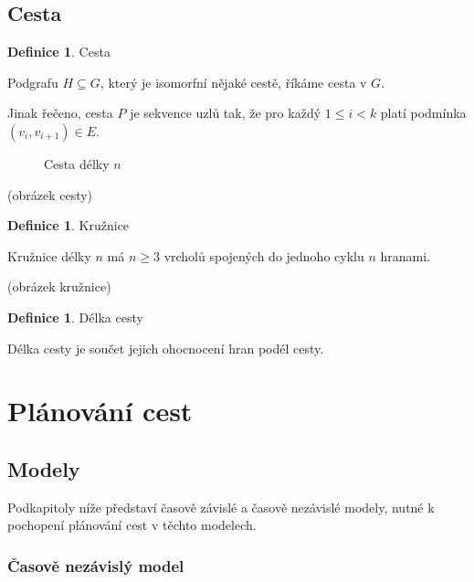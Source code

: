 \documentclass[thesis=M,czech]{FITthesis}[2019/12/23]
\theoremstyle{plain}
\theoremstyle{definition}
\newtheorem{defn}[thm]{Definice} %
\begin{document}
\subsection{Cesta}

\begin{defn}{Cesta}\label{thm:graf}

Podgrafu $H \subseteq	 G$, který je isomorfní nějaké cestě, říkáme cesta v $G$. 
\end{defn}

Jinak řečeno, cesta $P$ je sekvence uzlů tak, že pro každý $1 \leq	i < k$ platí podmínka $(v_i, v_{i+1}) \in	 E$. 

\begin{figure}[H]\centering
	

	\caption[Příklad obrázku]{Cesta délky $n$}\label{fig:float}
\end{figure}

% 

(obrázek cesty)

\begin{defn}{Kružnice}\label{thm:graf}

Kružnice délky $n$ má $n \geq 3$ vrcholů spojených do jednoho cyklu $n$ hranami.
\end{defn}

(obrázek kružnice)

\begin{defn}{Délka cesty}\label{thm:graf}

Délka cesty je součet jejich ohocnocení hran podél cesty.
\end{defn}


\section{Plánování cest}



\subsection{Modely}

Podkapitoly níže představí časově závislé a časově nezávislé modely, nutné k pochopení plánování cest v těchto modelech.

\subsubsection{Časově nezávislý model}
\end{document}
